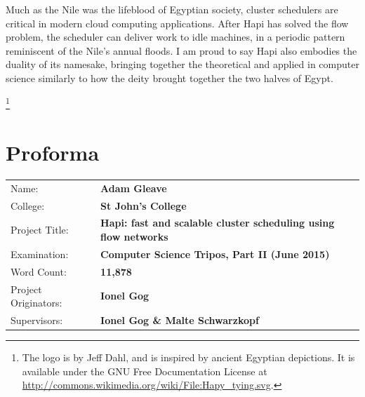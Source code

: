 \documentclass[12pt,a4paper,twoside,notitlepage]{report}
\theoremstyle{plain}
\theoremstyle{definition}
\theoremstyle{remark}
\newcommand\blfootnote[1]{%
    \begingroup
    \renewcommand\thefootnote{}\footnote{#1}%
    \addtocounter{footnote}{-1}%
    \endgroup
}
\begin{document}
Much as the Nile was the lifeblood of Egyptian society, cluster schedulers are critical in modern cloud computing applications. After Hapi has solved the flow problem, the scheduler can deliver work to idle machines, in a periodic pattern reminiscent of the Nile's annual floods. I am proud to say Hapi also embodies the duality of its namesake, bringing together the theoretical and applied in computer science similarly to how the deity brought together the two halves of Egypt.



\blfootnote{The logo is by Jeff Dahl, and is inspired by ancient Egyptian depictions. It is available under the GNU Free Documentation License at \url{http://commons.wikimedia.org/wiki/File:Hapy_tying.svg}.}

\vspace*{\fill}


\setcounter{page}{1}
\pagestyle{plain}
\chapter*{Proforma}
\vspace*{-2em}
{
	\begin{tabular}{ll}
		Name:			        & \textbf{Adam Gleave}					\\
		College:		        & \textbf{St John's College}\\
        Project Title:	        & \textbf{Hapi: fast and scalable cluster scheduling using flow networks}\\
		Examination:	        & \textbf{Computer Science Tripos, Part II (June 2015)}\\
        Word Count:		        & \textbf{11,878}\\
		Project Originators:	& \textbf{Ionel Gog}\\
        Supervisors:	        & \textbf{Ionel Gog \& Malte Schwarzkopf}\\
	\end{tabular}
}
\end{document}
